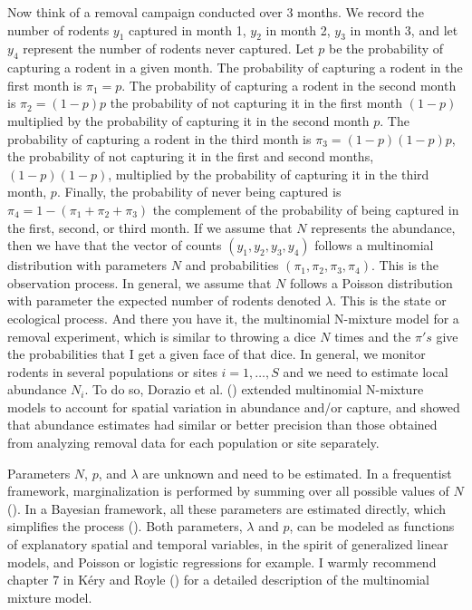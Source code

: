 \documentclass[
  11pt,
  a4paper,
]{article}
\begin{document}
Now think of a removal campaign conducted over 3 months. We record the number of rodents \(y_1\) captured in month 1, \(y_2\) in month 2, \(y_3\) in month 3, and let \(y_4\) represent the number of rodents never captured. Let \(p\) be the probability of capturing a rodent in a given month. The probability of capturing a rodent in the first month is \(\pi_1 = p\). The probability of capturing a rodent in the second month is \(\pi_2 = (1-p)p\) the probability of not capturing it in the first month \((1 - p)\) multiplied by the probability of capturing it in the second month \(p\). The probability of capturing a rodent in the third month is \(\pi_3 = (1-p)(1-p)p\), the probability of not capturing it in the first and second months, \((1 - p)(1 - p)\), multiplied by the probability of capturing it in the third month, \(p\). Finally, the probability of never being captured is \(\pi_4 = 1 - (\pi_1 + \pi_2 + \pi_3)\) the complement of the probability of being captured in the first, second, or third month. If we assume that \(N\) represents the abundance, then we have that the vector of counts \((y_1, y_2, y_3, y_4)\) follows a multinomial distribution with parameters \(N\) and probabilities \((\pi_1,\pi_2,\pi_3,\pi_4)\). This is the observation process. In general, we assume that \(N\) follows a Poisson distribution with parameter the expected number of rodents denoted \(\lambda\). This is the state or ecological process. And there you have it, the multinomial N-mixture model for a removal experiment, which is similar to throwing a dice \(N\) times and the \(\pi's\) give the probabilities that I get a given face of that dice. In general, we monitor rodents in several populations or sites \(i = 1,\ldots,S\) and we need to estimate local abundance \(N_i\). To do so, Dorazio et al. () extended multinomial N-mixture models to account for spatial variation in abundance and/or capture, and showed that abundance estimates had similar or better precision than those obtained from analyzing removal data for each population or site separately.

Parameters \(N\), \(p\), and \(\lambda\) are unknown and need to be estimated. In a frequentist framework, marginalization is performed by summing over all possible values of \(N\) (). In a Bayesian framework, all these parameters are estimated directly, which simplifies the process (). Both parameters, \(\lambda\) and \(p\), can be modeled as functions of explanatory spatial and temporal variables, in the spirit of generalized linear models, and Poisson or logistic regressions for example. I warmly recommend chapter 7 in Kéry and Royle () for a detailed description of the multinomial mixture model.
\end{document}
